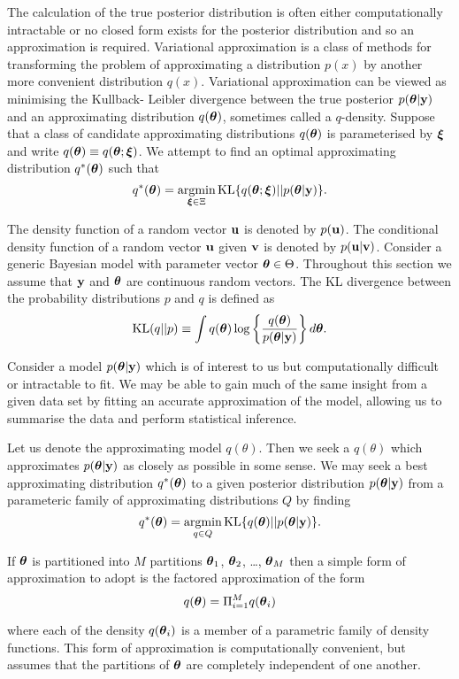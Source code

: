 The calculation of the true posterior distribution is often either computationally intractable or no closed form
exists for the posterior distribution and so an approximation is required. Variational approximation is a
class of methods for transforming the problem of approximating a distribution $p(x)$ by another more
convenient distribution $q(x)$. Variational approximation can be viewed as minimising the Kullback- Leibler
divergence between the true posterior $p({\boldsymbol \theta}|{\bf y})$ and an approximating distribution $q({\boldsymbol \theta})$,
sometimes called a $q$-density. Suppose that a class of candidate approximating distributions
$q({\boldsymbol \theta})$ is parameterised by ${\boldsymbol \xi}$ and write $q({\boldsymbol \theta})\equiv q({\boldsymbol \theta};{\boldsymbol \xi})$. We attempt to find an 
optimal approximating distribution $q^*({\boldsymbol \theta})$ such that
\[
	\ds q^*(\vtheta) = \argmin_{\vxi \in \Xi} \text{KL} \{ {q(\vtheta;\vxi) || p(\vtheta|\vy)} \}.
\]

The density function of a random vector ${\bf u}$ is denoted by $p({\bf u})$.  The conditional density function of a
random vector ${\bf u}$ given ${\bf v}$ is denoted by $p({\bf u}|{\bf v})$. Consider a generic Bayesian model with parameter
vector ${\boldsymbol \theta} \in \Theta$. Throughout this section we assume that ${\bf y}$ and ${\boldsymbol \theta}$ are continuous random
vectors. The KL divergence between the probability distributions $p$ and $q$ is defined as
\[
	\text{KL}(q || p) \equiv \int q({\boldsymbol \theta}) \log \left \{ \frac{q({\boldsymbol \theta})}{p({\boldsymbol \theta} | {\bf y})} \right \} d {\boldsymbol \theta}.
\]

Consider a model $p({\boldsymbol \theta}|{\bf y})$ which is of interest to us but computationally difficult or intractable to 
fit. We may be able to gain much of the same insight from a given data set by fitting an accurate approximation 
of the model, allowing us to summarise the data and perform statistical inference.

Let us denote the approximating model $q(\theta)$. Then we seek a $q(\theta)$ which approximates
$p({\boldsymbol \theta}|{\bf y})$ as closely as possible in some sense. 
We may seek a best approximating distribution $q^*({\boldsymbol \theta})$ to a given posterior distribution
$p({\boldsymbol \theta}|{\bf y})$ from a parameteric family of approximating distributions $Q$ by finding
\[
	q^*(\vtheta) = \argmin_{q \in Q} \KL \{ {q(\vtheta) || p(\vtheta|\vy)} \}.
\]

If ${\boldsymbol \theta}$ is partitioned into $M$ partitions ${\boldsymbol \theta}_1$, ${\boldsymbol \theta}_2$, \ldots, ${\boldsymbol \theta}_M$ then a 
simple form of approximation to adopt is the factored approximation of the form
\[
	q({\boldsymbol \theta}) = \Pi_{i=1}^M q({\boldsymbol \theta}_i)
\]

where each of the density $q({\boldsymbol \theta}_i)$ is a member of a parametric family of density functions. This form of
approximation is computationally convenient, but assumes that the partitions of ${\boldsymbol \theta}$ are completely
independent of one another.

